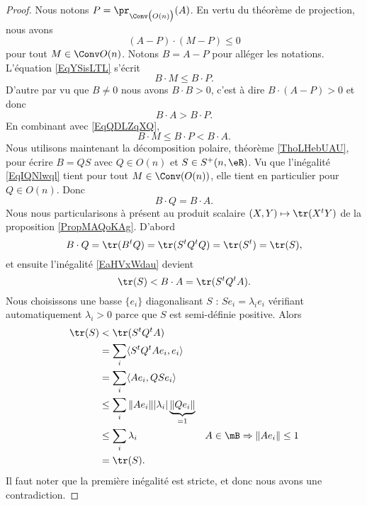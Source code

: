 \begin{proof}
    Nous notons \( P=\pr_{\Conv\big( O(n) \big)}(A)\). En vertu du théorème de projection, nous avons
    \begin{equation}    \label{EqYSisLTL}
        (A-P)\cdot (M-P)\leq 0
    \end{equation}
    pour tout \( M\in\Conv O(n)\). Notons \( B=A-P\) pour alléger les notations. L'équation \eqref{EqYSisLTL} s'écrit
    \begin{equation}    \label{EqQDLZqXQ}
        B\cdot M\leq B\cdot P.
    \end{equation}
    D'autre par vu que \( B \neq 0\) nous avons \( B\cdot B> 0\), c'est à dire \( B\cdot (A-P)>0\) et donc
    \begin{equation}
        B\cdot A>B\cdot P.
    \end{equation}
    En combinant avec \eqref{EqQDLZqXQ},
    \begin{equation}        \label{EqIQNlwql}
        B\cdot M\leq B\cdot P<B\cdot A.
    \end{equation}
    Nous utilisons maintenant la décomposition polaire, théorème \ref{ThoLHebUAU}, pour écrire \( B=QS\) avec \( Q\in O(n)\) et \( S\in S^+(n,\eR)\). Vu que l'inégalité \eqref{EqIQNlwql} tient pour tout \( M\in\Conv(O(n))\), elle tient en particulier pour \( Q\in O(n)\). Donc
    \begin{equation}
        B\cdot Q=B\cdot A.
    \end{equation}
    Nous nous particularisons à présent au produit scalaire \( (X,Y)\mapsto\tr(X^tY)\) de la proposition \ref{PropMAQoKAg}. D'abord
    \begin{equation}    \label{EaHVxWdau}
        B\cdot Q=\tr(B^tQ)=\tr(S^tQ^tQ)=\tr(S^t)=\tr(S),
    \end{equation}
    et ensuite l'inégalité \eqref{EaHVxWdau} devient
    \begin{equation}
        \tr(S)<B\cdot A=\tr(S^tQ^tA).
    \end{equation}
    Nous choisissons une basse \( \{ e_i \}\) diagonalisant \( S\) : \( Se_i=\lambda_ie_i\) vérifiant automatiquement \( \lambda_i>0\) parce que \( S\) est semi-définie positive. Alors
    \begin{subequations}
        \begin{align}
            \tr(S)&<\tr(S^tQ^tA)\\
            &=\sum_i\langle S^tQ^tAe_i, e_i\rangle \\
            &=\sum_i\langle Ae_i, QSe_i\rangle \\
            &\leq \sum_i \| Ae_i \| | \lambda_i | \underbrace{\| Qe_i \|}_{=1} \\
            &\leq \sum_i\lambda_i   & A\in\mB\Rightarrow\| Ae_i \|\leq 1\\
            &=\tr(S).
        \end{align}
    \end{subequations}
    Il faut noter que la première inégalité est stricte, et donc nous avons une contradiction.
\end{proof}

